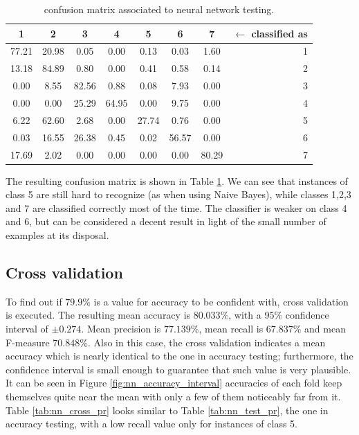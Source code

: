 \documentclass[a4paper, 10pt]{article}
\begin{document}
\begin{table}[H]
\centering
\begin{tabular}{|*{7}{c|}r|}
\hline

1 &2 &3 &4 &5 &6 &7 & $\leftarrow$ classified as \\\hline

\cellcolor{black!15}77.21 &20.98 &0.05 &0.00 &0.13 &0.03 &1.60 & 1 \\\hline

13.18 &\cellcolor{black!15}84.89 &0.80 &0.00 &0.41 &0.58 &0.14 & 2 \\\hline

0.00 &8.55 &\cellcolor{black!15}82.56 &0.88 &0.08 &7.93 &0.00 & 3 \\\hline

0.00 &0.00 &25.29 &\cellcolor{black!15}64.95 &0.00 &9.75 &0.00 & 4 \\\hline

6.22 &62.60 &2.68 &0.00 &\cellcolor{black!15}27.74 &0.76 &0.00 & 5 \\\hline

0.03 &16.55 &26.38 &0.45 &0.02 &\cellcolor{black!15}56.57 &0.00 & 6 \\\hline

17.69 &2.02 &0.00 &0.00 &0.00 &0.00 &\cellcolor{black!15}80.29 & 7 \\\hline

\end{tabular}
\caption{confusion matrix associated to neural network testing.}
\label{tab:nn_cf}
\end{table}

The resulting confusion matrix is shown in Table \ref{tab:nn_cf}. We can see that instances of class 5 are still hard to recognize (as when using Naive Bayes), while classes 1,2,3 and 7 are classified correctly most of the time. The classifier is weaker on class 4 and 6, but can be considered a decent result in light of the small number of examples at its disposal. 

\subsection{Cross validation}

To find out if $79.9\%$ is a value for accuracy to be confident with, cross validation is executed. The resulting mean accuracy is $80.033\%$, with a $95\%$ confidence interval of $\pm  0.274$. Mean precision is $77.139\%$, mean recall is $67.837\%$ and mean F-measure $70.848\%$. Also in this case, the cross validation indicates a mean accuracy which is nearly identical to the one in accuracy testing; furthermore, the confidence interval is small enough to guarantee that such value is very plausible. It can be seen in Figure \ref{fig:nn_accuracy_interval} accuracies of each fold keep themselves quite near the mean with only a few of them noticeably far from it. Table \ref{tab:nn_cross_pr} looks similar to Table \ref{tab:nn_test_pr}, the one in accuracy testing, with a low recall value only for instances of class 5.
\end{document}
